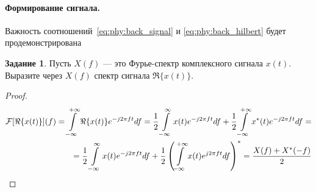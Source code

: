 \documentclass{book}
\numberwithin{theorem}{chapter}
\numberwithin{statement}{chapter}
\numberwithin{lemma}{chapter}
\theoremstyle{definition}
\newtheorem{task}{Задание}
\numberwithin{task}{chapter}
\theoremstyle{remark}
\numberwithin{example}{chapter}
\theoremstyle{definition}
\numberwithin{definition}{chapter}
\theoremstyle{remark}
\theoremstyle{remark}
\numberwithin{lyrics}{section}
\begin{document}
\paragraph{Формирование сигнала.} Важность соотношений~\eqref{eq:phy:back_signal} и \eqref{eq:phy:back_hilbert} будет продемонстрирована 


\begin{task}
	Пусть $X(f)$ --- это Фурье-спектр комплексного сигнала $x(t)$. Выразите через $X(f)$ спектр сигнала $\Re\{x(t)\}$.  
\end{task}
\begin{proof}
	\begin{equation}
	\label{eq:phy:complex:fourier_of_real_part}
	\begin{aligned}
	\mathcal{F}[\Re\{x(t)\}](f) = \int\limits_{-\infty}^{+\infty} \Re\{x(t)\}e^{-j2\pi f t} df = \frac{1}{2} \int\limits_{-\infty}^{\infty} x(t) e^{-j 2\pi f t} df + \frac{1}{2} \int\limits_{-\infty}^{+\infty} x^*(t) e^{-j2\pi f t} df = \\ 
	= \frac{1}{2} \int\limits_{-\infty}^{\infty} x(t) e^{-j 2\pi f t} df + \frac{1}{2} \left(\int\limits_{-\infty}^{+\infty} x(t) e^{j2\pi f t} df\right)^* = \frac{X(f) + X^*(-f)}{2}
	\end{aligned} 
	\end{equation}
\end{proof}
\end{document}
